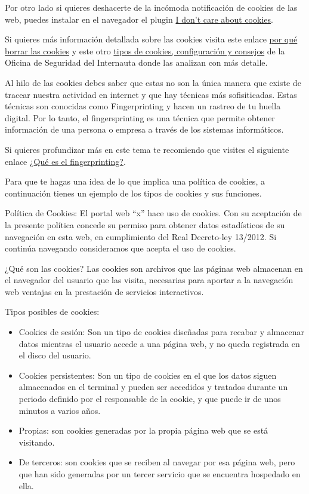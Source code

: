 \documentclass[
  spanish,
  a4paper,
  openany]{book}
\begin{document}
Por otro lado si quieres deshacerte de la incómoda notificación de cookies de las web, puedes instalar en el navegador el plugin \href{https://www.i-dont-care-about-cookies.eu/}{I don't care about cookies}.

Si quieres más información detallada sobre las cookies visita este enlace \href{https://www.osi.es/es/actualidad/blog/2019/09/11/por-que-borrar-las-cookies-del-navegador}{por qué borrar las cookies} y este otro \href{https://www.osi.es/es/actualidad/blog/2018/07/18/entre-cookies-y-privacidad}{tipos de cookies, configuración y consejos} de la Oficina de Seguridad del Internauta donde las analizan con más detalle.

Al hilo de las cookies debes saber que estas no son la única manera que existe de tracear nuestra actividad en internet y que hay técnicas más sofisiticadas. Estas técnicas son conocidas como Fingerprinting y hacen un rastreo de tu huella digital. Por lo tanto, el fingersprinting es una técnica que permite obtener información de una persona o empresa a través de los sistemas informáticos.

Si quieres profundizar más en este tema te recomiendo que visites el siguiente enlace \href{https://protecciondatos-lopd.com/empresas/fingerprinting-que-es/}{¿Qué es el fingerprinting?}.

Para que te hagas una idea de lo que implica una política de cookies, a continuación tienes un ejemplo de los tipos de cookies y sus funciones.

Política de Cookies:
El portal web ``x'' hace uso de cookies. Con su aceptación de la presente política concede su permiso para obtener datos estadísticos de su navegación en esta web, en cumplimiento del Real Decreto-ley 13/2012. Si continúa navegando consideramos que acepta el uso de cookies.

¿Qué son las cookies?
Las cookies son archivos que las páginas web almacenan en el navegador del usuario que las visita, necesarias para aportar a la navegación web ventajas en la prestación de servicios interactivos.

Tipos posibles de cookies:

\begin{itemize}
\item
  Cookies de sesión: Son un tipo de cookies diseñadas para recabar y almacenar datos mientras el usuario accede a una página web, y no queda registrada en el disco del usuario.
\item
  Cookies persistentes: Son un tipo de cookies en el que los datos siguen almacenados en el terminal y pueden ser accedidos y tratados durante un periodo definido por el responsable de la cookie, y que puede ir de unos minutos a varios años.
\item
  Propias: son cookies generadas por la propia página web que se está visitando.
\item
  De terceros: son cookies que se reciben al navegar por esa página web, pero que han sido generadas por un tercer servicio que se encuentra hospedado en ella.
\end{itemize}
\end{document}
